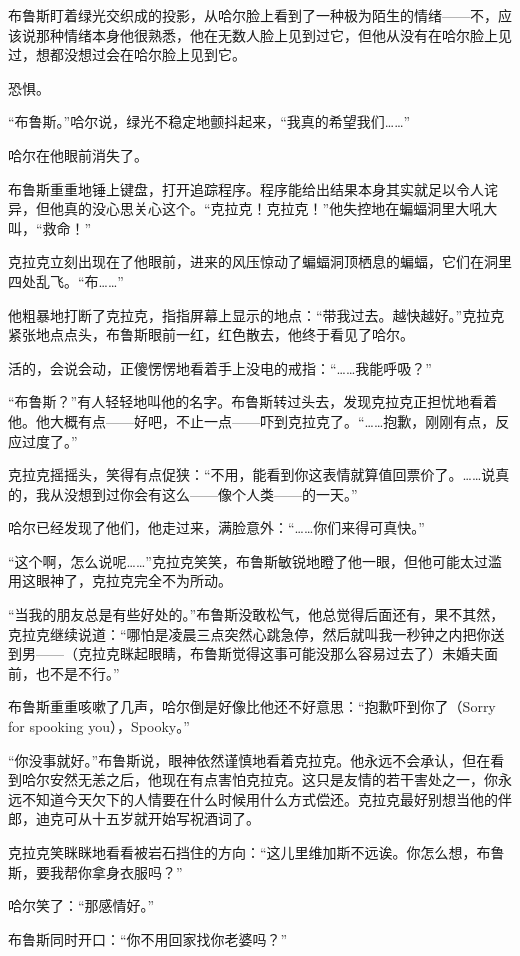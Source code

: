\documentclass[../main]{subfiles}
\begin{document}
布鲁斯盯着绿光交织成的投影，从哈尔脸上看到了一种极为陌生的情绪——不，应该说那种情绪本身他很熟悉，他在无数人脸上见到过它，但他从没有在哈尔脸上见过，想都没想过会在哈尔脸上见到它。

恐惧。

“布鲁斯。”哈尔说，绿光不稳定地颤抖起来，“我真的希望我们……”

哈尔在他眼前消失了。

布鲁斯重重地锤上键盘，打开追踪程序。程序能给出结果本身其实就足以令人诧异，但他真的没心思关心这个。“克拉克！克拉克！”他失控地在蝙蝠洞里大吼大叫，“救命！”

克拉克立刻出现在了他眼前，进来的风压惊动了蝙蝠洞顶栖息的蝙蝠，它们在洞里四处乱飞。“布……”

他粗暴地打断了克拉克，指指屏幕上显示的地点：“带我过去。越快越好。”克拉克紧张地点点头，布鲁斯眼前一红，红色散去，他终于看见了哈尔。

活的，会说会动，正傻愣愣地看着手上没电的戒指：“……我能呼吸？”

“布鲁斯？”有人轻轻地叫他的名字。布鲁斯转过头去，发现克拉克正担忧地看着他。他大概有点——好吧，不止一点——吓到克拉克了。“……抱歉，刚刚有点，反应过度了。”

克拉克摇摇头，笑得有点促狭：“不用，能看到你这表情就算值回票价了。……说真的，我从没想到过你会有这么——像个人类——的一天。”

哈尔已经发现了他们，他走过来，满脸意外：“……你们来得可真快。”

“这个啊，怎么说呢……”克拉克笑笑，布鲁斯敏锐地瞪了他一眼，但他可能太过滥用这眼神了，克拉克完全不为所动。

“当我的朋友总是有些好处的。”布鲁斯没敢松气，他总觉得后面还有，果不其然，克拉克继续说道：“哪怕是凌晨三点突然心跳急停，然后就叫我一秒钟之内把你送到男——（克拉克眯起眼睛，布鲁斯觉得这事可能没那么容易过去了）未婚夫面前，也不是不行。”

布鲁斯重重咳嗽了几声，哈尔倒是好像比他还不好意思：“抱歉吓到你了（Sorry for spooking you），Spooky。”

“你没事就好。”布鲁斯说，眼神依然谨慎地看着克拉克。他永远不会承认，但在看到哈尔安然无恙之后，他现在有点害怕克拉克。这只是友情的若干害处之一，你永远不知道今天欠下的人情要在什么时候用什么方式偿还。克拉克最好别想当他的伴郎，迪克可从十五岁就开始写祝酒词了。

克拉克笑眯眯地看看被岩石挡住的方向：“这儿里维加斯不远诶。你怎么想，布鲁斯，要我帮你拿身衣服吗？”

哈尔笑了：“那感情好。”

布鲁斯同时开口：“你不用回家找你老婆吗？”
\end{document}

